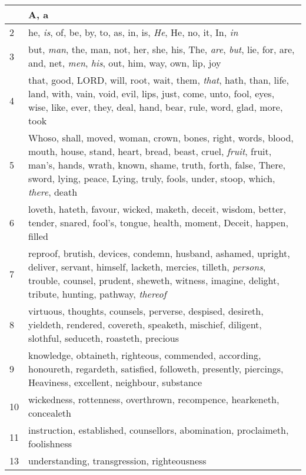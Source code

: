 \begin{center}
\begin{longtable}{l|p{3.75in}}
\hline \hline 
\endlastfoot 
1 & A, a\\ \hline 
2 & he, \emph{is}, of, be, by, to, as, in, is, \emph{He}, He, no, it, In, \emph{in}\\ \hline 
3 & but, \emph{man}, the, man, not, her, she, his, The, \emph{are}, \emph{but}, lie, for, are, and, net, \emph{men}, \emph{his}, out, him, way, own, lip, joy\\ \hline 
4 & that, good, LORD, will, root, wait, them, \emph{that}, hath, than, life, land, with, vain, void, evil, lips, just, come, unto, fool, eyes, wise, like, ever, they, deal, hand, bear, rule, word, glad, more, took\\ \hline 
5 & Whoso, shall, moved, woman, crown, bones, right, words, blood, mouth, house, stand, heart, bread, beast, cruel, \emph{fruit}, fruit, man's, hands, wrath, known, shame, truth, forth, false, There, sword, lying, peace, Lying, truly, fools, under, stoop, which, \emph{there}, death\\ \hline 
6 & loveth, hateth, favour, wicked, maketh, deceit, wisdom, better, tender, snared, fool's, tongue, health, moment, Deceit, happen, filled\\ \hline 
7 & reproof, brutish, devices, condemn, husband, ashamed, upright, deliver, servant, himself, lacketh, mercies, tilleth, \emph{persons}, trouble, counsel, prudent, sheweth, witness, imagine, delight, tribute, hunting, pathway, \emph{thereof}\\ \hline 
8 & virtuous, thoughts, counsels, perverse, despised, desireth, yieldeth, rendered, covereth, speaketh, mischief, diligent, slothful, seduceth, roasteth, precious\\ \hline 
9 & knowledge, obtaineth, righteous, commended, according, honoureth, regardeth, satisfied, followeth, presently, piercings, Heaviness, excellent, neighbour, substance\\ \hline 
10 & wickedness, rottenness, overthrown, recompence, hearkeneth, concealeth\\ \hline 
11 & instruction, established, counsellors, abomination, proclaimeth, foolishness\\ \hline 
13 & understanding, transgression, righteousness\\ \hline 
\end{longtable} 
\end{center} 




 
